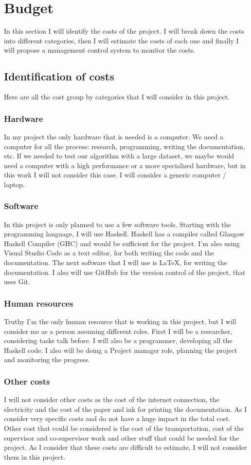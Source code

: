 \chapter{Budget}
In this section I will identify the costs of the project. 
I will break down the costs into different categories, then I will estimate the costs of each one and finally I will propose a management control system to monitor the costs.
\section{Identification of costs}
Here are all the cost group by categories that I will consider in this project.
\subsection*{Hardware}
In my project the only hardware that is needed is a computer.
We need a computer for all the process: research, programming, writing the documentation, etc.
If we needed to test our algorithm with a large dataset, we maybe would need a computer with a high performance or a more specialized hardware, but in this work I will not consider this case.
I will consider a generic computer / laptop.
\subsection*{Software}
In this project is only planned to use a few software tools.
Starting with the programming language, I will use Haskell.
Haskell has a compiler called Glasgow Haskell Compiler (GHC) and would be sufficient for the project.
I'm also using Visual Studio Code as a text editor, for both writing the code and the documentation.
The next software that I will use is \LaTeX, for writing the documentation.
I also will use GitHub for the version control of the project, that uses Git.
\subsection*{Human resources}
Truthy I'm the only human resource that is working in this project, but I will consider me as a person assuming different roles.
First I will be a researcher, considering tasks talk before.
I will also be a programmer, developing all the Haskell code.
I also will be doing a Project manager role, planning the project and monitoring the progress.
\subsection*{Other costs}
I will not consider other costs as the cost of the internet connection, the electricity and the cost of the paper and ink for printing the documentation.
As I consider very specific costs and do not have a huge impact in the total cost.
Other cost that could be considered is the cost of the transportation, cost of the supervisor and co-supervisor work and other stuff that could be needed for the project.
As I consider that these costs are difficult to estimate, I will not consider them in this project.
